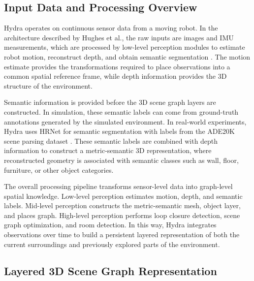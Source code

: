 \subsection{Input Data and Processing Overview}

{\small

Hydra operates on continuous sensor data from a moving robot. In the architecture described by Hughes et al., the raw inputs are images and IMU measurements, which are processed by low-level perception modules to estimate robot motion, reconstruct depth, and obtain semantic segmentation \cite{hughes2022hydra}. The motion estimate provides the transformations required to place observations into a common spatial reference frame, while depth information provides the 3D structure of the environment.

Semantic information is provided before the 3D scene graph layers are constructed. In simulation, these semantic labels can come from ground-truth annotations generated by the simulated environment. In real-world experiments, Hydra uses HRNet for semantic segmentation with labels from the ADE20K scene parsing dataset \cite{hughes2022hydra,wang2021hrnet,zhou2017ade20k}. These semantic labels are combined with depth information to construct a metric-semantic 3D representation, where reconstructed geometry is associated with semantic classes such as wall, floor, furniture, or other object categories.

The overall processing pipeline transforms sensor-level data into graph-level spatial knowledge. Low-level perception estimates motion, depth, and semantic labels. Mid-level perception constructs the metric-semantic mesh, object layer, and places graph. High-level perception performs loop closure detection, scene graph optimization, and room detection. In this way, Hydra integrates observations over time to build a persistent layered representation of both the current surroundings and previously explored parts of the environment.

}

\subsection{Layered 3D Scene Graph Representation}

